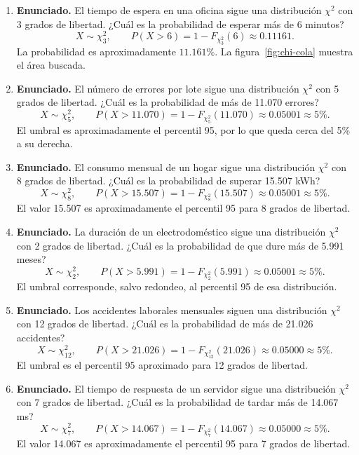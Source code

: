 \documentclass[11pt]{article}
\begin{document}
\begin{enumerate}
  \item \textbf{Enunciado.} El tiempo de espera en una oficina sigue una distribución $\chi^2$ con 3 grados de libertad. ¿Cuál es la probabilidad de esperar más de 6 minutos?
  \[
  X\sim\chi^2_3,\qquad P(X>6)=1-F_{\chi^2_3}(6)\approx0.11161.
  \]
  La probabilidad es aproximadamente $11.161\%$. La figura~\ref{fig:chi-cola} muestra el área buscada.

  \item \textbf{Enunciado.} El número de errores por lote sigue una distribución $\chi^2$ con 5 grados de libertad. ¿Cuál es la probabilidad de más de 11.070 errores?
  \[
  X\sim\chi^2_5,\qquad P(X>11.070)=1-F_{\chi^2_5}(11.070)\approx0.05001\approx5\%.
  \]
  El umbral es aproximadamente el percentil 95, por lo que queda cerca del 5\% a su derecha.

  \item \textbf{Enunciado.} El consumo mensual de un hogar sigue una distribución $\chi^2$ con 8 grados de libertad. ¿Cuál es la probabilidad de superar 15.507 kWh?
  \[
  X\sim\chi^2_8,\qquad P(X>15.507)=1-F_{\chi^2_8}(15.507)\approx0.05001\approx5\%.
  \]
  El valor 15.507 es aproximadamente el percentil 95 para 8 grados de libertad.

  \item \textbf{Enunciado.} La duración de un electrodoméstico sigue una distribución $\chi^2$ con 2 grados de libertad. ¿Cuál es la probabilidad de que dure más de 5.991 meses?
  \[
  X\sim\chi^2_2,\qquad P(X>5.991)=1-F_{\chi^2_2}(5.991)\approx0.05001\approx5\%.
  \]
  El umbral corresponde, salvo redondeo, al percentil 95 de esa distribución.

  \item \textbf{Enunciado.} Los accidentes laborales mensuales siguen una distribución $\chi^2$ con 12 grados de libertad. ¿Cuál es la probabilidad de más de 21.026 accidentes?
  \[
  X\sim\chi^2_{12},\qquad P(X>21.026)=1-F_{\chi^2_{12}}(21.026)\approx0.05000\approx5\%.
  \]
  El umbral es el percentil 95 aproximado para 12 grados de libertad.

  \item \textbf{Enunciado.} El tiempo de respuesta de un servidor sigue una distribución $\chi^2$ con 7 grados de libertad. ¿Cuál es la probabilidad de tardar más de 14.067 ms?
  \[
  X\sim\chi^2_7,\qquad P(X>14.067)=1-F_{\chi^2_7}(14.067)\approx0.05000\approx5\%.
  \]
  El valor 14.067 es aproximadamente el percentil 95 para 7 grados de libertad.


\end{enumerate}
\end{document}
